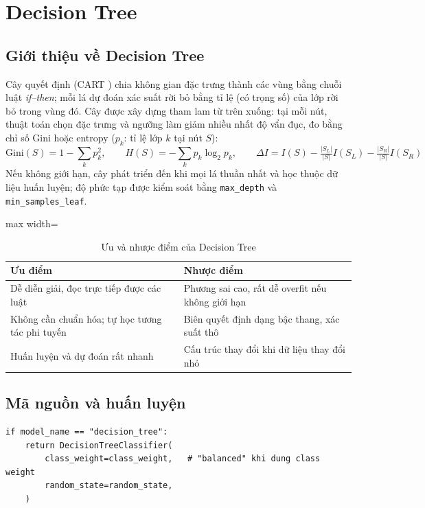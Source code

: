 \section{Decision Tree}\label{sec:dt}

\subsection{Giới thiệu về Decision Tree}
Cây quyết định (CART \cite{breiman1984}) chia không gian đặc trưng thành các vùng bằng chuỗi luật \textit{if--then}; mỗi lá dự đoán xác suất rời bỏ bằng tỉ lệ (có trọng số) của lớp rời bỏ trong vùng đó. Cây được xây dựng tham lam từ trên xuống: tại mỗi nút, thuật toán chọn đặc trưng và ngưỡng làm giảm nhiều nhất độ vẩn đục, đo bằng chỉ số Gini hoặc entropy ($p_k$: tỉ lệ lớp $k$ tại nút $S$):
\begin{equation}
    \text{Gini}(S) = 1 - \sum_{k} p_k^2, \qquad
    H(S) = -\sum_{k} p_k \log_2 p_k, \qquad
    \Delta I = I(S) - \tfrac{|S_L|}{|S|} I(S_L) - \tfrac{|S_R|}{|S|} I(S_R)
\end{equation}
Nếu không giới hạn, cây phát triển đến khi mọi lá thuần nhất và học thuộc dữ liệu huấn luyện; độ phức tạp được kiểm soát bằng \texttt{max\_depth} và \texttt{min\_samples\_leaf}.

\begin{table}[H]
\centering
\begin{adjustbox}{max width=\textwidth}
\begin{tabular}{|p{7cm}|p{7cm}|}
\hline
\textbf{Ưu điểm} & \textbf{Nhược điểm} \\
\hline
Dễ diễn giải, đọc trực tiếp được các luật & Phương sai cao, rất dễ overfit nếu không giới hạn \\
\hline
Không cần chuẩn hóa; tự học tương tác phi tuyến & Biên quyết định dạng bậc thang, xác suất thô \\
\hline
Huấn luyện và dự đoán rất nhanh & Cấu trúc thay đổi khi dữ liệu thay đổi nhỏ \\
\hline
\end{tabular}
\end{adjustbox}
\caption{Ưu và nhược điểm của Decision Tree}
\end{table}

\subsection{Mã nguồn và huấn luyện}
\begin{lstlisting}[style=pythonstyle, caption={Khởi tạo Decision Tree trong \texttt{src/models.py}}]
if model_name == "decision_tree":
    return DecisionTreeClassifier(
        class_weight=class_weight,   # "balanced" khi dung class weight
        random_state=random_state,
    )
\end{lstlisting}

